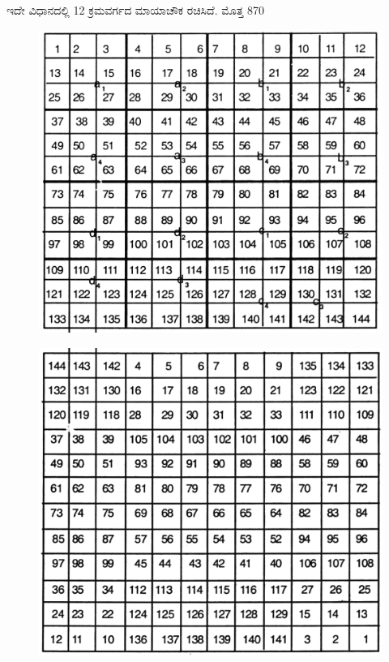 ಇದೇ ವಿಧಾನದಲ್ಲಿ 12 ಕ್ರಮವರ್ಗದ ಮಾಯಾಚೌಕ ರಚಿಸಿದೆ. ಮೊತ್ತ 870
\begin{figure}[H]
\includegraphics[scale=.8]{src/figures/chap3/fig3.28.jpg}
\end{figure}
\begin{figure}[H]
\includegraphics[scale=.8]{src/figures/chap3/fig3.29.jpg}
\end{figure}

